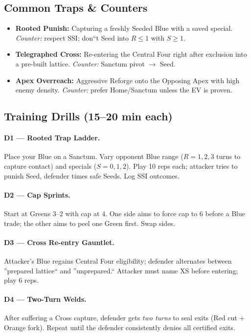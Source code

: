 \documentclass[11pt]{article}
\begin{document}
\bigskip

\subsection*{Common Traps \& Counters}
\begin{itemize}
  \item \textbf{Rooted Punish:} Capturing a freshly Seeded Blue with a saved special. \emph{Counter:} respect SSI; don``t Seed into $R\!\le\!1$ with $S\!\ge\!1$.
  \item \textbf{Telegraphed Cross:} Re-entering the Central Four right after exclusion into a pre-built lattice. \emph{Counter:} Sanctum pivot $\rightarrow$ Seed.
  \item \textbf{Apex Overreach:} Aggressive Reforge onto the Opposing Apex with high enemy density. \emph{Counter:} prefer Home/Sanctum unless the EV is proven.
\end{itemize}

\subsection*{Training Drills (15--20 min each)}
\paragraph{D1 --- Rooted Trap Ladder.}
Place your Blue on a Sanctum. Vary opponent Blue range ($R\!=\!1,2,3$ turns to capture contact) and specials ($S\!=\!0,1,2$). Play 10 reps each; attacker tries to punish Seed, defender times safe Seeds. Log SSI outcomes.

\paragraph{D2 --- Cap Sprints.}
Start at Greens $3$--$2$ with cap at $4$. One side aims to force cap to $6$ before a Blue trade; the other aims to peel one Green first. Swap sides.

\paragraph{D3 --- Cross Re-entry Gauntlet.}
Attacker's Blue regains Central Four eligibility; defender alternates between ''prepared lattice`` and ''unprepared.`` Attacker must name XS before entering; play 6 reps.

\paragraph{D4 --- Two-Turn Welds.}
After suffering a Cross capture, defender gets \emph{two turns} to seal exits (Red cut + Orange fork). Repeat until the defender consistently denies all certified exits.
\end{document}
